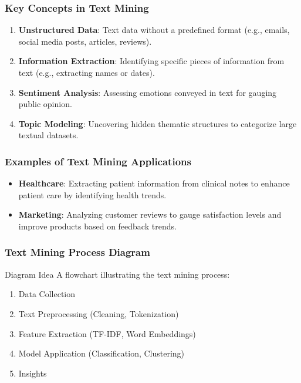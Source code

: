 \documentclass[aspectratio=169]{beamer}
\begin{document}
\begin{frame}[fragile]
    \frametitle{Key Concepts in Text Mining}
    \begin{enumerate}
        \item \textbf{Unstructured Data}: Text data without a predefined format (e.g., emails, social media posts, articles, reviews).
        \item \textbf{Information Extraction}: Identifying specific pieces of information from text (e.g., extracting names or dates).
        \item \textbf{Sentiment Analysis}: Assessing emotions conveyed in text for gauging public opinion.
        \item \textbf{Topic Modeling}: Uncovering hidden thematic structures to categorize large textual datasets.
    \end{enumerate}
\end{frame}

\begin{frame}[fragile]
    \frametitle{Examples of Text Mining Applications}
    \begin{itemize}
        \item \textbf{Healthcare}: Extracting patient information from clinical notes to enhance patient care by identifying health trends.
        \item \textbf{Marketing}: Analyzing customer reviews to gauge satisfaction levels and improve products based on feedback trends.
    \end{itemize}
\end{frame}

\begin{frame}[fragile]
    \frametitle{Text Mining Process Diagram}
    \begin{block}{Diagram Idea}
        A flowchart illustrating the text mining process:
        \begin{enumerate}
            \item Data Collection
            \item Text Preprocessing (Cleaning, Tokenization)
            \item Feature Extraction (TF-IDF, Word Embeddings)
            \item Model Application (Classification, Clustering)
            \item Insights
        \end{enumerate}
    \end{block}
\end{frame}
\end{document}
